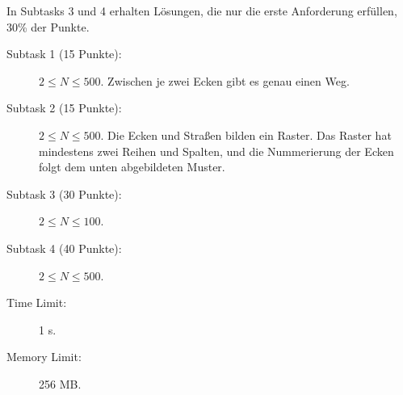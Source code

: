 \documentclass{boi2014-de}
\begin{document}
    In Subtasks 3 und 4 erhalten Lösungen, 
    die nur die erste Anforderung erfüllen, 30\% der Punkte.

    \begin{description}
        \item[Subtask 1 (15 Punkte):] $2 \le N \le 500$. 
        Zwischen je zwei Ecken gibt es genau einen Weg.
        \item[Subtask 2 (15 Punkte):] $2 \le N \le 500$. 
        Die Ecken und Straßen bilden ein Raster.  Das Raster hat mindestens zwei Reihen und Spalten,
        und die Nummerierung der Ecken folgt dem unten abgebildeten Muster.
        \begin{figure}[h!]
           \centering
        \end{figure}
        \item[Subtask 3 (30 Punkte):] $2 \le N \le 100$.
        \item[Subtask 4 (40 Punkte):] $2 \le N \le 500$.
    \end{description}

    \Constraints
    
    \begin{description}
        \item[Time Limit:] 1 s.
        \item[Memory Limit:] 256 MB.
    \end{description}

\end{document}
